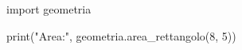 \begin{unipdcode}[language=Python]
import geometria

print("Area:", geometria.area_rettangolo(8, 5))
\end{unipdcode}
